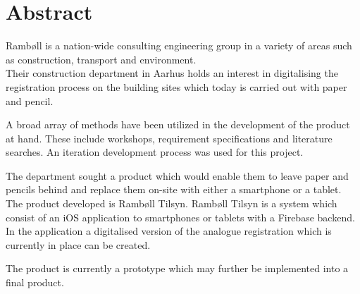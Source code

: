 {\let\clearpage\relax \chapter*{Abstract}}

Rambøll is a nation-wide consulting engineering group in a variety of areas such as construction, transport and environment. \\
Their construction department in Aarhus holds an interest in digitalising the registration process on the building sites which today is carried out with paper and pencil.  

A broad array of methods have been utilized in the development of the product at hand. These include workshops, requirement specifications and literature searches. An iteration development process was used for this project. 

The department sought a product which would enable them to leave paper and pencils behind and replace them on-site with either a smartphone or a tablet. 
The product developed is Rambøll Tilsyn. Rambøll Tilsyn is a system which consist of an iOS application to smartphones or tablets with a Firebase backend. 
In the application a digitalised version of the analogue registration which is currently in place can be created. 

The product is currently a prototype which may further be implemented into a final product.       


\clearpage



